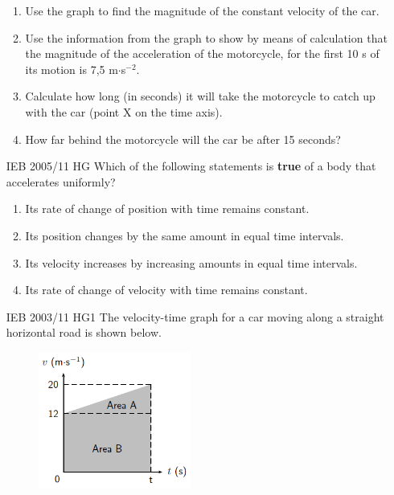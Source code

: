 \begin{enumerate}[noitemsep, label=\textbf{\arabic*}. ]
    \addtocounter{footnote}{-0}
    \label{m38796*id82156}\begin{enumerate}[noitemsep, label=\textbf{\alph*}. ] 
            \label{m38796*uid203}\item Use the graph to find the magnitude of the constant velocity of the car.
\label{m38796*uid204}\item Use the information from the graph to show by means of calculation that the magnitude of the acceleration of the motorcycle, for the first 10 s of its motion is 7,5 m\begin{math}\ensuremath{\cdot}\end{math}s\begin{math}{}^{-2}\end{math}.
\label{m38796*uid205}\item Calculate how long (in seconds) it will take the motorcycle to catch up with the car (point X on the time axis).
\label{m38796*uid206}\item How far behind the motorcycle will the car be after 15 seconds?
\end{enumerate}
                \label{m38796*uid207}\item [IEB 2005/11 HG] Which of the following statements is \textbf{true} of a body that accelerates uniformly?
\label{m38796*id82255}\begin{enumerate}[noitemsep, label=\textbf{\alph*}. ] 
            \label{m38796*uid208}\item Its rate of change of position with time remains constant.
\label{m38796*uid209}\item Its position changes by the same amount in equal time intervals.
\label{m38796*uid210}\item Its velocity increases by increasing amounts in equal time intervals.
\label{m38796*uid211}\item Its rate of change of velocity with time remains constant.
\end{enumerate}
                \label{m38796*uid212}\item [IEB 2003/11 HG1] The velocity-time graph for a car moving along a straight horizontal road is shown below.

    \setcounter{subfigure}{0}


	\begin{figure}[H] %
    \begin{center}
    \label{m38796*id82326!!!underscore!!!media}\label{m38796*id82326!!!underscore!!!printimage}\includegraphics[width=5cm]{col11305.imgs/m38796_PG10C2_054.png} %
        

\end{center}
\end{figure}
\end{enumerate}
